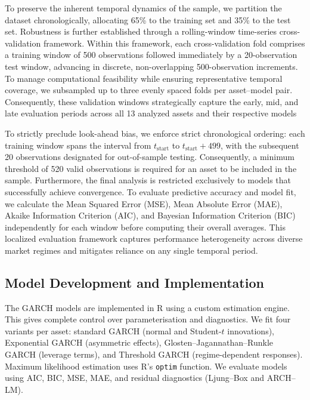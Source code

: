 \documentclass[risks,article,submit,pdftex,moreauthors]{Definitions/mdpi}
\begin{document}
To preserve the inherent temporal dynamics of the sample, we partition the dataset chronologically, allocating 65\% to the training set and 35\% to the test set. Robustness is further established through a rolling-window time-series cross-validation framework. Within this framework, each cross-validation fold comprises a training window of 500 observations followed immediately by a 20-observation test window, advancing in discrete, non-overlapping 500-observation increments. To manage computational feasibility while ensuring representative temporal coverage, we subsampled up to three evenly spaced folds per asset–model pair. Consequently, these validation windows strategically capture the early, mid, and late evaluation periods across all 13 analyzed assets and their respective models


To strictly preclude look-ahead bias, we enforce strict chronological ordering: each training window spans the interval from $t_{\text{start}}$ to $t_{\text{start}} + 499$, with the subsequent 20 observations designated for out-of-sample testing. Consequently, a minimum threshold of 520 valid observations is required for an asset to be included in the sample. Furthermore, the final analysis is restricted exclusively to models that successfully achieve convergence. To evaluate predictive accuracy and model fit, we calculate the Mean Squared Error (MSE), Mean Absolute Error (MAE), Akaike Information Criterion (AIC), and Bayesian Information Criterion (BIC) independently for each window before computing their overall averages. This localized evaluation framework captures performance heterogeneity across diverse market regimes and mitigates reliance on any single temporal period.


\subsection{Model Development and Implementation} 

The GARCH models are implemented in \textsf{R} using a custom estimation engine. This gives complete control over parameterisation and diagnostics. We fit four variants per asset: standard GARCH (normal and Student-$t$ innovations), Exponential GARCH (asymmetric effects), Glosten–Jagannathan–Runkle GARCH (leverage terms), and Threshold GARCH (regime-dependent responses). Maximum likelihood estimation uses \textsf{R}'s \texttt{optim} function. We evaluate models using AIC, BIC, MSE, MAE, and residual diagnostics (Ljung–Box and ARCH–LM).
\end{document}

